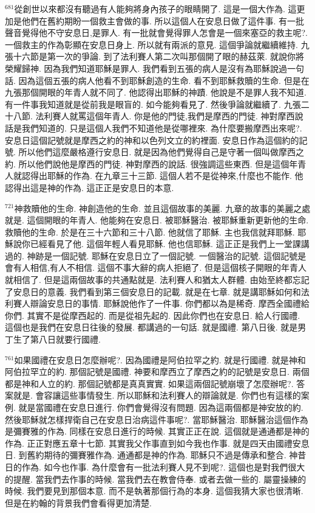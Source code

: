\documentclass{book}
\begin{document}
$^{681}$從創世以來都沒有聽過有人能夠將身內孩子的眼睛開了.
這是一個大作為.
這更加是他們在舊約期盼一個救主會做的事.
所以這個人在安息日做了這件事.
有一批聲音覺得他不守安息日,是罪人.
有一批就會覺得罪人怎會是一個來塞亞的救主呢?.
一個救主的作為彰顯在安息日身上.
所以就有兩派的意見.
這個爭論就繼續維持.
九張十六節是第一次的爭論.
到了法利賽人第二次叫那個開了眼的赫茲萊.
就說你將榮耀歸神.
因為我們知道耶穌是罪人.
我們看到五張的病人是沒有為耶穌說過一句話.
因為這個五張的病人他看不到耶穌創造的生命.
看不到耶穌救贖的生命.
但是在九張那個開眼的年青人就不同了.
他認得出耶穌的神蹟.
他說是不是罪人我不知道.
有一件事我知道就是從前我是眼盲的.
如今能夠看見了.
然後爭論就繼續了.
九張二十八節.
法利賽人就罵這個年青人.
你是他的門徒,我們是摩西的門徒.
神對摩西說話是我們知道的.
只是這個人我們不知道他是從哪裡來.
為什麼要搬摩西出來呢?.
安息日這個記號就是摩西之約的神和以色列文立的約裡面.
安息日作為這個約的記號.
所以他們這麼嚴格遵行安息日.
就是因為他們覺得自己是守著一個叫做摩西之約.
所以他們說他是摩西的門徒.
神對摩西的說話.
很強調這些東西.
但是這個年青人就認得出耶穌的作為.
在九章三十三節.
這個人若不是從神來,什麼也不能作.
他認得出這是神的作為.
這正正是安息日的本意.

$^{721}$神救贖他的生命.
神創造他的生命.
並且這個故事的美麗.
九章的故事的美麗之處就是.
這個開眼的年青人.
他能夠在安息日.
被耶穌醫治.
被耶穌重新更新他的生命.
救贖他的生命.
於是在三十六節和三十八節.
他就信了耶穌.
主也我信就拜耶穌.
耶穌說你已經看見了他.
這個年輕人看見耶穌.
他也信耶穌.
這正正是我們上一堂課講過的.
神跡是一個記號.
耶穌在安息日立了一個記號.
一個醫治的記號.
這個記號是會有人相信,有人不相信.
這個不事大辭的病人拒絕了.
但是這個核子開眼的年青人就相信了.
但是這兩個故事的共通點就是.
法利賽人和猶太人群體.
由始至終都忘記了安息日的意義.
我們看到第三個安息日的記載.
就是在七章.
就是講耶穌如何和法利賽人辯論安息日的事情.
耶穌說他作了一件事.
你們都以為是稀奇.
摩西全國禮給你們.
其實不是從摩西起的.
而是從祖先起的.
因此你們也在安息日.
給人行國禮.
這個也是我們在安息日往後的發展.
都講過的一句話.
就是國禮.
第八日後.
就是男丁生了第八日就要行國禮.

$^{761}$如果國禮在安息日怎麼辦呢?.
因為國禮是阿伯拉罕之約.
就是行國禮.
就是神和阿伯拉罕立的約.
那個記號是國禮.
神要和摩西立了摩西之約的記號是安息日.
兩個都是神和人立的約.
那個記號都是真真實實.
如果這兩個記號崩壞了怎麼辦呢?.
答案就是.
會容讓這些事情發生.
所以耶穌和法利賽人的辯論就是.
你們也有這樣的案例.
就是當國禮在安息日進行.
你們會覺得沒有問題.
因為這兩個都是神安放的約.
然後耶穌就怎樣捍衛自己在安息日治病這件事呢?.
當耶穌醫治.
耶穌醫治這個作為是彌賽雅的作為.
同樣在安息日進行的時候.
其實正正在說.
這個就是通通都是神的作為.
正正對應五章十七節.
其實我父作事直到如今我也作事.
就是四天由國禮安息日.
到舊約期待的彌賽雅作為.
通通都是神的作為.
耶穌只不過是傳承和整合.
神昔日的作為.
如今也作事.
為什麼會有一批法利賽人見不到呢?.
這個也是對我們很大的提醒.
當我們去作事的時候.
當我們去在教會侍奉.
或者去做一些的.
屬靈操練的時候.
我們要見到那個本意.
而不是執著那個行為的本身.
這個我猜大家也很清晰.
但是在約翰的背景我們會看得更加清楚.
\end{document}
